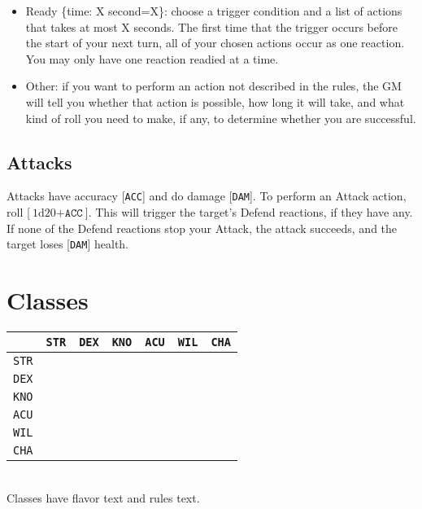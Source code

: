 \documentclass[12pt]{article}
\newcommand{\STR}{\texttt{STR}}
\newcommand{\DEX}{\texttt{DEX}}
\newcommand{\KNO}{\texttt{KNO}}
\newcommand{\ACU}{\texttt{ACU}}
\newcommand{\WIL}{\texttt{WIL}}
\newcommand{\CHA}{\texttt{CHA}}
\newcommand{\ACC}{\texttt{ACC}}
\newcommand{\DAM}{\texttt{DAM}}
\newcommand{\TIME}[1]{\{time: #1 second\if1=#1{}\else{s}\fi\}}
\newcommand{\dice}[2]{\text{#1d#2}}
\begin{document}
\begin{itemize}
\item Ready \TIME{X}: choose a trigger condition and a list of actions that takes at most X seconds. The first time that the trigger occurs before the start of your next turn, all of your chosen actions occur as one reaction. You may only have one reaction readied at a time.

\item Other: if you want to perform an action not described in the rules, the GM will tell you whether that action is possible, how long it will take, and what kind of roll you need to make, if any, to determine whether you are successful.

\end{itemize}

\subsection{Attacks}

Attacks have accuracy [\ACC] and do damage [\DAM]. To perform an Attack action, roll [$\dice{1}{20} + \ACC$]. This will trigger the target’s Defend reactions, if they have any. If none of the Defend reactions stop your Attack, the attack succeeds, and the target loses [\DAM] health.

\pagebreak
\section{Classes}

\begin{tabularx}{\textwidth}{c|CCCCCC}
& \STR & \DEX & \KNO & \ACU & \WIL & \CHA \\\hline
\STR &  &  &  &  &  &  \\
\DEX &  &  &  &  &  &  \\
\KNO &  &  &  &  &  &  \\
\ACU &  &  &  &  &  &   \\
\WIL &  &  &  &  &  &  \\
\CHA &  &  &  &  &  &  \\
\end{tabularx}
\\[5mm]
Classes have flavor text and rules text.
\end{document}
